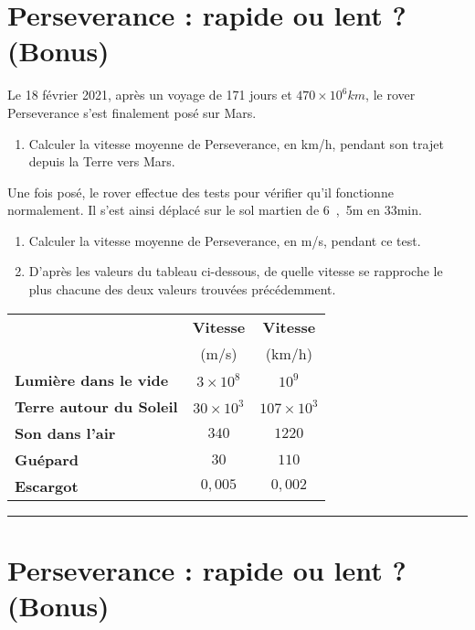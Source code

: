 \documentclass[12pt,a4paper]{article}
\begin{document}
\section*{Perseverance : rapide ou lent ? (Bonus)}

Le 18 février 2021, après un voyage de 171 jours et $\unit{470\times10^6}{km}$, le rover Perseverance s'est finalement posé sur Mars.
\begin{enumerate}
\item \rea{} 

Calculer la vitesse moyenne de Perseverance, en km/h, pendant son trajet depuis la Terre vers Mars.
\end{enumerate}

Une fois posé, le rover effectue des tests pour vérifier qu'il fonctionne normalement.
Il s'est ainsi déplacé sur le sol martien de \unit{6{,}5}{m} en \unit{33}{min}.

\begin{enumerate}[resume]
\item \rea{}

Calculer la vitesse moyenne de Perseverance, en m/s, pendant ce test.

\item \val{}

D'après les valeurs du tableau ci-dessous, de quelle vitesse se rapproche le plus chacune des deux valeurs trouvées précédemment.
\end{enumerate}

\begin{center}
\begin{tabular}{|l|c|c|}
\hline
													& \textbf{Vitesse}		& \textbf{Vitesse} \\
													& (m/s)										& (km/h) \\
\hline
\hline
\textbf{Lumière dans le vide}	& $3\times10^8$		& $10^9$ \\
\textbf{Terre autour du Soleil}	& $30\times10^3$		& $107\times 10^3$\\
\textbf{Son dans l'air}				& $340$						& $1220$ \\
\textbf{Guépard}						& $30$						& $110$ \\
\textbf{Escargot}						& $0{,}005$	& $0{,}002$ \\
\hline

\end{tabular}
\end{center}

\hrule

\section*{Perseverance : rapide ou lent ? (Bonus)}
\end{document}
